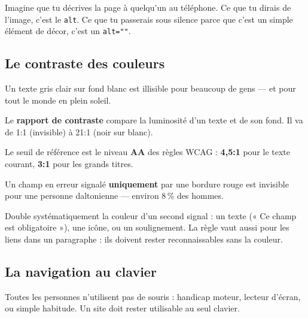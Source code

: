 \documentclass[a4paper,11pt]{article}
\begin{document}
\begin{tcolorbox}[astuce, title={Le test du téléphone}]
Imagine que tu décrives la page à quelqu'un au téléphone. Ce que tu dirais de l'image, c'est le \texttt{alt}. Ce que tu passerais sous silence parce que c'est un simple élément de décor, c'est un \texttt{alt=""}.
\end{tcolorbox}

\subsection{Le contraste des couleurs}

Un texte gris clair sur fond blanc est illisible pour beaucoup de gens --- et pour tout le monde en plein soleil.

\begin{tcolorbox}[definition, title={Définition --- Rapport de contraste}]
Le \textbf{rapport de contraste} compare la luminosité d'un texte et de son fond. Il va de 1:1 (invisible) à 21:1 (noir sur blanc).

\vspace{3pt}
Le seuil de référence est le niveau \textbf{AA} des règles WCAG : \textbf{4{,}5:1} pour le texte courant, \textbf{3:1} pour les grands titres.
\end{tcolorbox}

\begin{tcolorbox}[attention, title={La couleur ne doit jamais être la seule information}]
Un champ en erreur signalé \textbf{uniquement} par une bordure rouge est invisible pour une personne daltonienne --- environ 8\,\% des hommes.

\vspace{3pt}
Double systématiquement la couleur d'un second signal : un texte (« Ce champ est obligatoire »), une icône, ou un soulignement. La règle vaut aussi pour les liens dans un paragraphe : ils doivent rester reconnaissables sans la couleur.
\end{tcolorbox}

\subsection{La navigation au clavier}

Toutes les personnes n'utilisent pas de souris : handicap moteur, lecteur d'écran, ou simple habitude. Un site doit rester utilisable au seul clavier.
\end{document}
